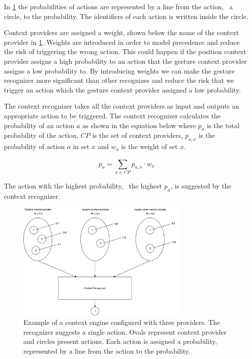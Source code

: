 In \cref{fig:design:context-engine:single-suggestion} the probabilities of actions are represented by a line from the action, \ie~a circle, to the probability. The identifiers of each action is written inside the circle. 

Context providers are assigned a weight, shown below the name of the context provider in \cref{fig:design:context-engine:single-suggestion}. Weights are introduced in order ​to​ model precedence and reduce the risk of triggering the wrong action. This could happen if the position context provider assigns a high probability to an action that the gesture context provider assigns a low probability to. By introducing weights we can make the gesture recognizer more significant than other recognizes and reduce the risk that we trigger an action which the gesture context provider assigned a low probability.

The context recognizer takes all the context providers as input and outputs an appropriate action to be triggered. The context recognizer calculates the probability of an action $a$ as shown in the equation below where $p_a$ is the total probability of the action, $CP$ is the set of context providers, $p_{a,x}$ is the probability of action $a$ in set $x$ and $w_x$ is the weight of set $x$.

\begin{equation*}
p_a = \sum\limits_{x \in CP}^{} p_{a,x} \cdot w_{x}
\end{equation*}

The action with the highest probability, \ie~the highest $p_a$, is suggested by the context recognizer.

\begin{figure}[h!]
\centering
\includegraphics[width=0.75\textwidth]{images/context-engine-single-suggestion}
\caption{Example of a context engine configured with three providers. The recognizer suggests a single action. Ovals represent context provider and circles present actions. Each action is assigned a probability, represented by a line from the action to the probability.}
\label{fig:design:context-engine:single-suggestion}
\end{figure}


